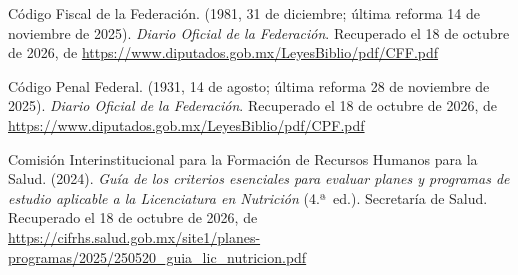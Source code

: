 \documentclass[12pt, a4paper]{article}
\begin{document}
\begin{list}{}{\setlength{\leftmargin}{1.27cm}\setlength{\itemindent}{-1.27cm}%
  \setlength{\labelwidth}{0pt}\setlength{\labelsep}{0pt}\setlength{\itemsep}{6pt}}
 
\item Código Fiscal de la Federación. (1981, 31 de diciembre;
   última reforma 14 de noviembre de 2025). \textit{Diario Oficial de la
Federación}. Recuperado el 18 de octubre de 2026, de \url{https://www.diputados.gob.mx/LeyesBiblio/pdf/CFF.pdf}
 
 
\item Código Penal Federal. (1931, 14 de agosto; última reforma
  28 de noviembre de 2025). \textit{Diario Oficial de la Federación}. Recuperado el 18 de octubre de 2026, de \url{https://www.diputados.gob.mx/LeyesBiblio/pdf/CPF.pdf}

 
\item Comisión Interinstitucional para la Formación de Recursos Humanos
  para la Salud. (2024). \textit{Guía de los criterios esenciales para
  evaluar planes y programas de estudio aplicable a la Licenciatura en
  Nutrición} (4.ª~ed.). Secretaría de Salud.
  Recuperado el 18 de octubre de 2026, de \url{https://cifrhs.salud.gob.mx/site1/planes-programas/2025/250520_guia_lic_nutricion.pdf}
 
 

\end{list}
\end{document}
